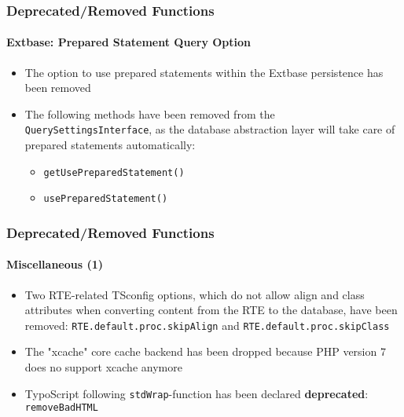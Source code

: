 \begin{frame}[fragile]
	\frametitle{Deprecated/Removed Functions}
	\framesubtitle{Extbase: Prepared Statement Query Option}

	\begin{itemize}

		\item The option to use prepared statements within the Extbase persistence has been removed

		\item The following methods have been removed from the \texttt{QuerySettingsInterface},
			as the database abstraction layer will take care of prepared statements automatically:

			\begin{itemize}
				\item \texttt{getUsePreparedStatement()}
				\item \texttt{usePreparedStatement()}
			\end{itemize}

	\end{itemize}

\end{frame}


\begin{frame}[fragile]
	\frametitle{Deprecated/Removed Functions}
	\framesubtitle{Miscellaneous (1)}

	\begin{itemize}

		\item Two RTE-related TSconfig options, which do not allow align and class attributes when converting
			content from the RTE to the database, have been removed:\newline
			\small
				\texttt{RTE.default.proc.skipAlign} and \texttt{RTE.default.proc.skipClass}
			\normalsize

		\item The "xcache" core cache backend has been dropped because PHP version 7 does no support xcache anymore

		\item TypoScript following \texttt{stdWrap}-function has been declared \textbf{deprecated}:\newline
			\texttt{removeBadHTML}

	\end{itemize}

\end{frame}

